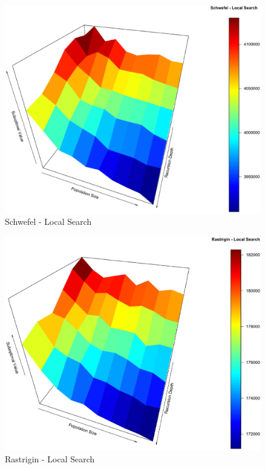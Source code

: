 \documentclass[conference]{IEEEtran}
\begin{document}
\begin{figure}[tbp]
\centering
\includegraphics[width=1.0\hsize]{fig09.eps}
\caption{Schwefel - Local Search}
\label{fig03}
\end{figure}

\begin{figure}[tbp]
\centering
\includegraphics[width=1.0\hsize]{fig12.eps}
\caption{Rastrigin - Local Search}
\label{fig04}
\end{figure}
\end{document}
